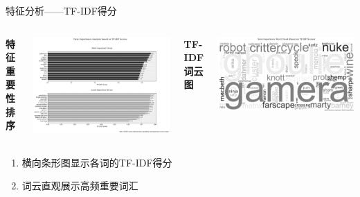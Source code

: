\documentclass{beamer}
\begin{document}
\begin{frame}{特征分析——TF-IDF得分}
    \begin{columns}
        \textbf{特征重要性排序}
        \begin{center}
            \includegraphics[width=\textwidth]{pic/LR2.png}
        \end{center}

        \textbf{TF-IDF词云图}
        \begin{center}
            \includegraphics[width=\textwidth]{pic/LR3.png}
        \end{center}
    \end{columns}
    \vspace{0.2cm}
    \begin{enumerate}
        \item 横向条形图显示各词的TF-IDF得分
        \item 词云直观展示高频重要词汇
    \end{enumerate}
\end{frame}
\end{document}
